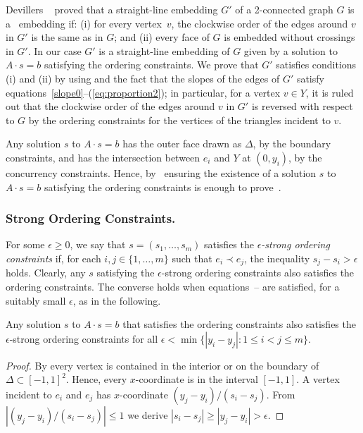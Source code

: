 \begin{proofsketch}
Devillers \etal\ \cite{devillers.liotta.ea:checking} proved that a straight-line embedding $G'$ of a 2-connected graph $G$ is a \Fary\ embedding if: (i) for every vertex~$v$, the clockwise order of the edges around $v$ in $G'$ is the same as in $G$; and (ii) every face of $G$ is embedded without crossings in $G'$. In our case $G'$ is a straight-line embedding of $G$ given by a solution to $A\cdot s = b$ satisfying the ordering constraints. We prove that $G'$ satisfies conditions (i) and (ii) by using  and the fact that the slopes of the edges of $G'$ satisfy equations~\eqref{slope0}--(\ref{eq:proportion2}); in particular, for a vertex $v\in Y$, it is ruled out that the clockwise order of the edges around $v$ in $G'$ is reversed with respect to $G$ by the ordering constraints for the vertices of the triangles incident to $v$.
\end{proofsketch}


Any solution $s$ to $A\cdot s=b$ has the outer face drawn as $\Delta$, by the boundary constraints, and has the intersection between $e_i$ and $Y$ at $(0,y_i)$, by the concurrency constraints. Hence, by~ ensuring the existence of a solution $s$ to $A\cdot s=b$ satisfying the ordering constraints is enough to prove~.

\subsubsection{Strong Ordering Constraints.}
\label{strong}
%
For some $\epsilon \ge 0$, we say that $s=(s_1,\ldots,s_m)$ satisfies
the \emph{$\epsilon$-strong ordering constraints} if, for each
$i,j\in\{1,\ldots,m\}$ such that $e_i\prec e_j$, the inequality
$s_j-s_i > \epsilon$ holds.
Clearly, any $s$ satisfying the $\epsilon$-strong ordering constraints also satisfies the ordering constraints. The converse holds when equations~\thetag{\ref{eq:slope0}}--\thetag{\ref{eq:proportion2}} are satisfied, for a suitably small $\epsilon$, as in the following.

\begin{lem}
	Any solution $s$ to $A\cdot s=b$ that satisfies
	the ordering constraints
	also satisfies 
	the $\epsilon$-strong ordering constraints
	for all $\epsilon<\min\{|y_i-y_j| : 1\le i< j\le m\}$.
\end{lem}

\begin{proof}
	By  every vertex is contained in the interior or on the boundary of $\Delta\subset[-1,1]^2$.
	Hence, every $x$-coordinate is
	in the interval $[-1,1]$.
	A vertex incident to $e_i$ and $e_j$ has $x$-coordinate
	$(y_j-y_i)/(s_i-s_j)$.
	From $|(y_j-y_i)/(s_i-s_j)|\le 1$ we derive
	$|s_i-s_j|\ge|y_j-y_i| > \epsilon$.
\end{proof}

